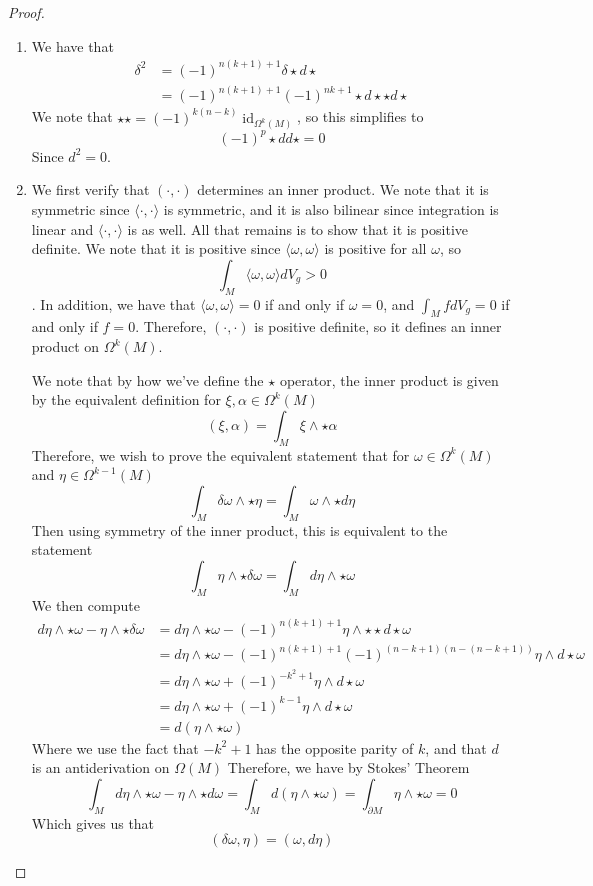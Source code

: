 \documentclass[psamsfonts]{amsart}
\theoremstyle{definition}
\theoremstyle{remark}
\DeclareMathOperator{\id}{id}
\begin{document}
\begin{proof}
\begin{enumerate}
\item We have that
\begin{align*}
\delta^2 &= (-1)^{n(k+1)+1} \delta \star d \star \\
&= (-1)^{n(k+1) + 1}(-1)^{nk + 1} \star d \star \star d \star
\end{align*}
We note that $\star\star = (-1)^{k(n-k)}\id_{\Omega^k(M)}$, so this simplifies to
$$(-1)^p \star d d \star = 0 $$
Since $d^2 = 0$.
\item We first verify that $(\cdot, \cdot)$ determines  an inner product. We note that it is symmetric since $\langle  \cdot, \cdot \rangle$ is symmetric, and it is also bilinear since integration is linear and $\langle \cdot, \cdot \rangle$ is as well. All that remains is to show that it is positive definite. We note that it is positive since $\langle \omega, \omega \rangle$ is positive for all $\omega$, so 
$$\int_M \langle\omega,\omega\rangle dV_g > 0$$
. In addition, we have that $\langle \omega, \omega \rangle = 0$ if and only if $\omega = 0$, and $\int_M fdV_g = 0$ if and only  if $f = 0$. Therefore, $(\cdot,\cdot)$ is positive definite, so it defines an inner product on $\Omega^k(M)$.

We note that by how we've define the $\star$ operator, the inner product is given  by the equivalent definition for $\xi, \alpha \in \Omega^k(M)$
$$(\xi, \alpha) = \int_M \xi \wedge \star \alpha $$
Therefore, we wish to  prove the equivalent statement that for $\omega \in \Omega^k(M)$ and $\eta
\in \Omega^{k-1}(M)$
$$\int_M  \delta\omega \wedge \star\eta = \int_M \omega \wedge \star d\eta $$
Then using symmetry of the inner product, this is equivalent to the statement
$$\int_M \eta \wedge \star\delta\omega = \int_M d\eta \wedge \star\omega $$
We then compute
\begin{align*}
d\eta \wedge \star\omega - \eta \wedge \star\delta\omega &= d\eta \wedge\star\omega - (-1)^{n(k+1)+1}\eta \wedge \star\star d\star\omega \\
&= d\eta \wedge \star\omega - (-1)^{n(k+1)+1}(-1)^{(n-k+1)(n-(n-k+1))}\eta \wedge d\star\omega \\
&= d\eta \wedge \star\omega + (-1)^{-k^2 + 1}  \eta \wedge d\star\omega \\
&= d\eta \wedge  \star\omega + (-1)^{k-1}\eta\wedge d\star\omega \\
&= d(\eta \wedge \star\omega)
\end{align*}
Where we use the fact that $-k^2  + 1$ has the opposite parity of $k$, and that $d$ is an antiderivation on $\Omega(M)$
Therefore, we have by Stokes' Theorem
$$\int_M d\eta \wedge \star\omega - \eta \wedge \star d\omega = \int_M d(\eta \wedge\star\omega) = \int_{\partial M} \eta \wedge  \star\omega = 0 $$
Which gives us that 
$$ (\delta\omega, \eta)= (\omega,d\eta)$$
\end{enumerate}
\end{proof}
\end{document}
